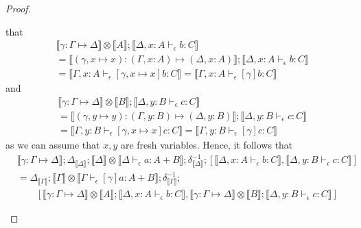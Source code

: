 \documentclass[acmsmall,screen,review]{acmart}
\newcommand{\bhyp}[2]{#1 : #2}
\newcommand{\hasty}[4]{#1 \vdash_{#2} #3: {#4}}
\newcommand{\issubst}[3]{#1: #2 \mapsto #3}
\newcommand{\dnt}[1]{\llbracket{#1}\rrbracket}
\begin{document}
\begin{proof}
\begin{itemize}[leftmargin=*]
    that
    \begin{equation}
      \begin{aligned}
      & \dnt{\issubst{\gamma}{\Gamma}{\Delta}} \otimes \dnt{A} 
      ; \dnt{\hasty{\Delta, \bhyp{x}{A}}{\epsilon}{b}{C}}
      \\ &= \dnt{\issubst{(\gamma, x \mapsto x)}{(\Gamma, \bhyp{x}{A})}{(\Delta, \bhyp{x}{A})}}
      ; \dnt{\hasty{\Delta, \bhyp{x}{A}}{\epsilon}{b}{C}}
      \\ &= \dnt{\hasty{\Gamma, \bhyp{x}{A}}{\epsilon}{[\gamma, x \mapsto x]b}{C}}
          = \dnt{\hasty{\Gamma, \bhyp{x}{A}}{\epsilon}{[\gamma]b}{C}}
      \end{aligned}
    \end{equation}
    and
    \begin{equation}
      \begin{aligned}
      & \dnt{\issubst{\gamma}{\Gamma}{\Delta}} \otimes \dnt{B} 
      ; \dnt{\hasty{\Delta, \bhyp{y}{B}}{\epsilon}{c}{C}}
      \\ &= \dnt{\issubst{(\gamma, y \mapsto y)}{(\Gamma, \bhyp{y}{B})}{(\Delta, \bhyp{y}{B})}}
      ; \dnt{\hasty{\Delta, \bhyp{y}{B}}{\epsilon}{c}{C}}
      \\ &= \dnt{\hasty{\Gamma, \bhyp{y}{B}}{\epsilon}{[\gamma, x \mapsto x]c}{C}}
          = \dnt{\hasty{\Gamma, \bhyp{y}{B}}{\epsilon}{[\gamma]c}{C}}
      \end{aligned}
    \end{equation}
    as we can assume that $x, y$ are fresh variables. Hence, it follows that
    \begin{equation}
      \begin{aligned}
        & \dnt{\issubst{\gamma}{\Gamma}{\Delta}}
        ; \Delta_{\dnt{\Delta}} 
        ; \dnt{\Delta} \otimes \dnt{\hasty{\Delta}{\epsilon}{a}{A + B}}
        ; \delta^{-1}_{\dnt{\Delta}} 
        ; [
          \dnt{\hasty{\Delta, \bhyp{x}{A}}{\epsilon}{b}{C}}, 
          \dnt{\hasty{\Delta, \bhyp{y}{B}}{\epsilon}{c}{C}}
        ] 
        \\ &
        = \Delta_{\dnt{\Gamma}}
        ; \dnt{\Gamma} \otimes \dnt{\hasty{\Gamma}{\epsilon}{[\gamma]a}{A + B}}
        ; \delta^{-1}_{\dnt{\Gamma}}
        ;  \\ & \qquad
        [
          \dnt{\issubst{\gamma}{\Gamma}{\Delta}} \otimes \dnt{A} 
            ; \dnt{\hasty{\Delta, \bhyp{x}{A}}{\epsilon}{b}{C}}, 
          \dnt{\issubst{\gamma}{\Gamma}{\Delta}} \otimes \dnt{B} 
            ; \dnt{\hasty{\Delta, \bhyp{y}{B}}{\epsilon}{c}{C}}
        ] 

\end{aligned}
\end{equation}
\end{itemize}
\end{proof}
\end{document}
